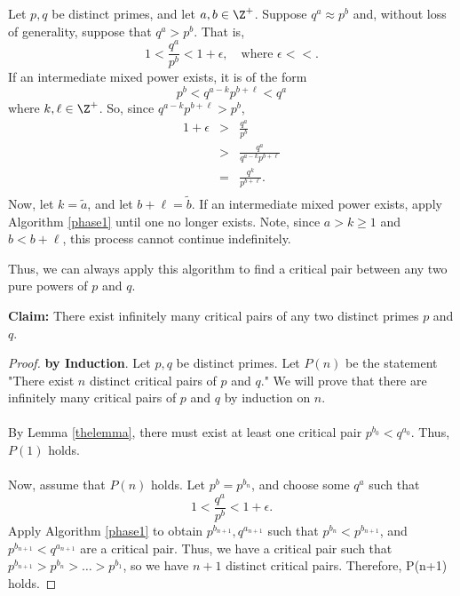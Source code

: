 \documentclass[a5paper]{article}
\begin{document}
\begin{algorithm}\label{phase1} Let $p,q$ be distinct primes, and let $a,b \in \Z^+$. Suppose $q^a \approx p^b$ and, without loss of generality, suppose that $q^a>p^b$. That is, 
$$1 < \frac{q^a}{p^b} < 1+\epsilon, \quad \text{where } \epsilon <<.$$
If an intermediate mixed power exists, it is of the form 
\begin{equation}\label{thechink}
p^b < q^{a-k}p^{b+\ell} < q^a
\end{equation}
where $k,\ell \in \Z^+$. So, since $q^{a-k}p^{b+\ell} > p^b$, 
\[
\begin{array}{rcl}
1+\epsilon &>& \frac{q^a}{p^b}\\
&>&\frac{q^a}{q^{a-k}p^{b+\ell}}\\
&=&\frac{q^k}{p^{b+\ell}}.\\
\end{array}
\]
Now, let $k=\tilde{a}$, and let $b+\ell=\tilde{b}$. If an intermediate mixed power exists, apply Algorithm \ref{phase1} until one no longer exists. Note, since $a>k\geq 1$ and $b<b+\ell$, this process cannot continue indefinitely. 

Thus, we can always apply this algorithm to find a critical pair between any two pure powers of $p$ and $q$.
\end{algorithm}

\noindent\textbf{Claim: }There exist infinitely many critical pairs of any two distinct primes $p$ and $q$.

\begin{proof}\textbf{by Induction}. Let $p,q$ be distinct primes. Let $P(n)$ be the statement "There exist $n$ distinct critical pairs of $p$ and $q$." We will prove that there are infinitely many critical pairs of $p$ and $q$ by induction on $n$. \\
\\
By Lemma \ref{thelemma}, there must exist at least one critical pair $p^{b_0}<q^{a_0}$. Thus, $P(1)$ holds. \\
\\
Now, assume that $P(n)$ holds. Let $p^b=p^{b_n}$, and choose some $q^a$ such that 
$$1<\frac{q^a}{p^b}<1+\epsilon.$$
Apply Algorithm \ref{phase1} to obtain $p^{b_{n+1}},q^{a_{n+1}}$ such that $p^{b_n}<p^{b_{n+1}}$, and $p^{b_{n+1}}<q^{a_{n+1}}$ are a critical pair. Thus, we have a critical pair such that $p^{b_{n+1}} > p^{b_{n}} > \ldots > p^{b_{1}}$, so we have $n+1$ distinct critical pairs. Therefore, P(n+1) holds. 
\end{proof}
\end{document}
